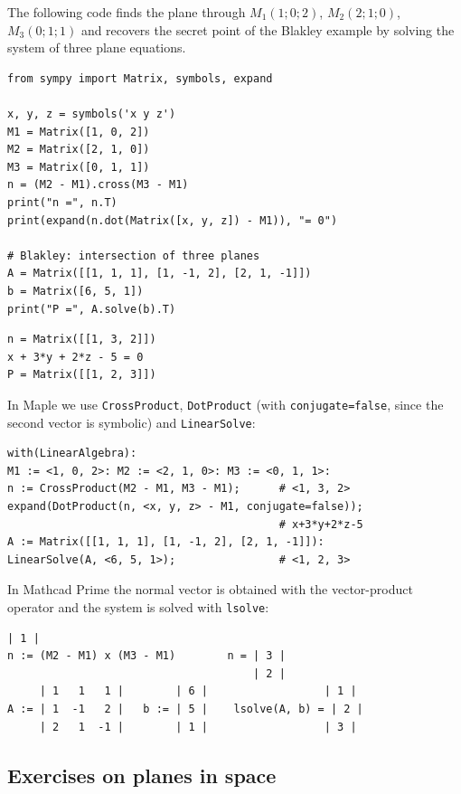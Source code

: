 The following code finds the plane through $M_1(1;0;2)$, $M_2(2;1;0)$,
$M_3(0;1;1)$ and recovers the secret point of the Blakley example by solving
the system of three plane equations.
\begin{Verbatim}[fontsize=\footnotesize,frame=single,label={\small Python}]
from sympy import Matrix, symbols, expand

x, y, z = symbols('x y z')
M1 = Matrix([1, 0, 2])
M2 = Matrix([2, 1, 0])
M3 = Matrix([0, 1, 1])
n = (M2 - M1).cross(M3 - M1)
print("n =", n.T)
print(expand(n.dot(Matrix([x, y, z]) - M1)), "= 0")

# Blakley: intersection of three planes
A = Matrix([[1, 1, 1], [1, -1, 2], [2, 1, -1]])
b = Matrix([6, 5, 1])
print("P =", A.solve(b).T)
\end{Verbatim}
\begin{Verbatim}[fontsize=\footnotesize,frame=single,label={\small Output}]
n = Matrix([[1, 3, 2]])
x + 3*y + 2*z - 5 = 0
P = Matrix([[1, 2, 3]])
\end{Verbatim}
In Maple we use \texttt{CrossProduct}, \texttt{DotProduct} (with
\texttt{conjugate=false}, since the second vector is symbolic) and
\texttt{LinearSolve}:
\begin{Verbatim}[fontsize=\footnotesize,frame=single,label={\small Maple}]
with(LinearAlgebra):
M1 := <1, 0, 2>: M2 := <2, 1, 0>: M3 := <0, 1, 1>:
n := CrossProduct(M2 - M1, M3 - M1);      # <1, 3, 2>
expand(DotProduct(n, <x, y, z> - M1, conjugate=false));
                                          # x+3*y+2*z-5
A := Matrix([[1, 1, 1], [1, -1, 2], [2, 1, -1]]):
LinearSolve(A, <6, 5, 1>);                # <1, 2, 3>
\end{Verbatim}
In Mathcad Prime the normal vector is obtained with the vector-product
operator and the system is solved with \texttt{lsolve}:
\begin{Verbatim}[fontsize=\footnotesize,frame=single,label={\small Mathcad}]
                                      | 1 |
n := (M2 - M1) x (M3 - M1)        n = | 3 |
                                      | 2 |
     | 1   1   1 |        | 6 |                  | 1 |
A := | 1  -1   2 |   b := | 5 |    lsolve(A, b) = | 2 |
     | 2   1  -1 |        | 1 |                  | 3 |
\end{Verbatim}

\subsection{Exercises on planes in space}

